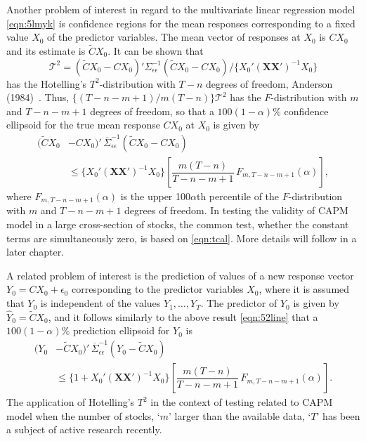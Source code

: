 Another problem of interest in regard to the multivariate linear regression model \eqref{eqn:5lmyk} is confidence regions for the mean responses corresponding to a fixed value $X_0$ of the predictor variables. The mean vector of responses at $X_0$ is $CX_0$ and its estimate is $\tilde{C}X_0$. It can be shown that
	\begin{equation} \label{eqn:tcal}
	\mathcal{T}^2= ( \tilde{C }X_0 - CX_0)' \Sigma_{\epsilon\epsilon}^{-1} (\tilde{C} X_0 - CX_0) / \{X_0'(\mathbf{X} \mathbf{X}')^{-1}X_0 \}
	\end{equation}
has the Hotelling's $T^2$-distribution with $T - n$ degrees of freedom, Anderson (1984)~\cite[Chap. 5]{andersontw2}. Thus, $\{(T - n - m + 1)/ m(T - n)\} \mathcal{T}^2$ has the $F$-distribution with $m$ and $T - n - m + 1$ degrees of freedom, so that a $100(1 - \alpha)\%$ confidence ellipsoid for the true mean response $CX_0$ at $X_0$ is given by 
	\begin{equation} \label{eqn:52line}
	\begin{split}
	(\tilde{C}X_0 & -CX_0)' \, \overline{\Sigma}_{\epsilon\epsilon}^{-1} (\tilde{C}X_0 - CX_0) \\
	&\leq \{X_0' (\mathbf{X}\mathbf{X}')^{-1} X_0\} \left[ \dfrac{m(T - n)}{T - n - m + 1}\, F_{m,T - n - m + 1}(\alpha) \right],
	 \end{split}
	\end{equation}
where $F_{m,T - n - m + 1}(\alpha)$ is the upper 100$\alpha$th percentile of the $F$-distribution with $m$ and $T - n - m + 1$ degrees of freedom. In testing the validity of CAPM model in a large cross-section of stocks, the common test, whether the constant terms are simultaneously zero, is based on \eqref{eqn:tcal}. More details will follow in a later chapter.


A related problem of interest is the prediction of values of a new response vector $Y_0= CX_0 + \epsilon_0$ corresponding to the predictor variables $X_0$, where it is assumed that $Y_0$ is independent of the values $Y_1, \ldots, Y_T$. The predictor of $Y_0$ is given by $\hat{Y}_0= \tilde{C}X_0$, and it follows similarly to the above result \eqref{eqn:52line} that a $100(1 - \alpha)\%$ prediction ellipsoid for $Y_0$ is
	\begin{equation} \label{eqn:52another2}
	\begin{split}
	(Y_0 & -\tilde{C}X_0)' \, \overline{\Sigma}_{\epsilon\epsilon}^{-1} (Y_0 - \tilde{C} X_0) \\
	&\leq \{1 + X_0'(\mathbf{X}\mathbf{X}')^{-1} X_0\} \left[ \dfrac{m(T - n)}{T - n - m + 1} \, F_{m,T - n - m + 1}(\alpha) \right].
	\end{split}
	\end{equation}
The application of Hotelling's $T^2$ in the context of testing related to CAPM model when the number of stocks, `$m$' larger than the available data, `$T$' has been a subject of active research recently. \label{in:multreg2}



